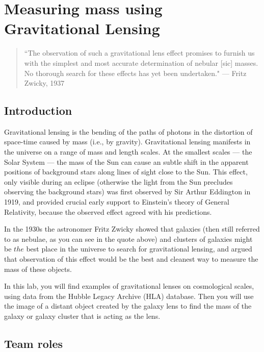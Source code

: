 \chapter{Measuring mass using Gravitational Lensing}

\begin{quote}
	``The observation of such a gravitational lens effect promises to
		furnish us with the simplest and most accurate determination of
		nebular [sic] masses. No thorough search for these effects has
		yet been undertaken."  --- Fritz Zwicky, 1937
\end{quote}

\section{Introduction}

Gravitational lensing is the bending of the paths of photons in the
distortion of space-time caused by mass (i.e., by gravity). Gravitational
lensing manifests in the universe on a range of mass and length
scales. At the smallest scales --- the Solar System --- the mass of the
Sun can cause an subtle shift in the apparent positions of background
stars along lines of sight close to the Sun. This effect, only visible
during an eclipse (otherwise the light from the Sun precludes observing
the background stars) was first observed by Sir Arthur Eddington in
1919, and provided crucial early support to Einstein's theory of General Relativity, because the
observed effect agreed with his predictions.

In the 1930s the astronomer Fritz Zwicky showed that galaxies (then
still referred to as nebulae, as you can see in the quote above) and
clusters of galaxies might be $the$ best place in the universe to
search for gravitational lensing, and argued that observation of this
effect would be the best and cleanest way to measure the mass of these
objects. 

In this lab, you will find examples of gravitational lenses on cosmological scales,
using data from the 
Hubble Legacy Archive (HLA) database.
Then you will use the image of a distant
object created by the galaxy lens to find the mass of the galaxy or
galaxy cluster that is acting as the lens.

\section{Team roles}

